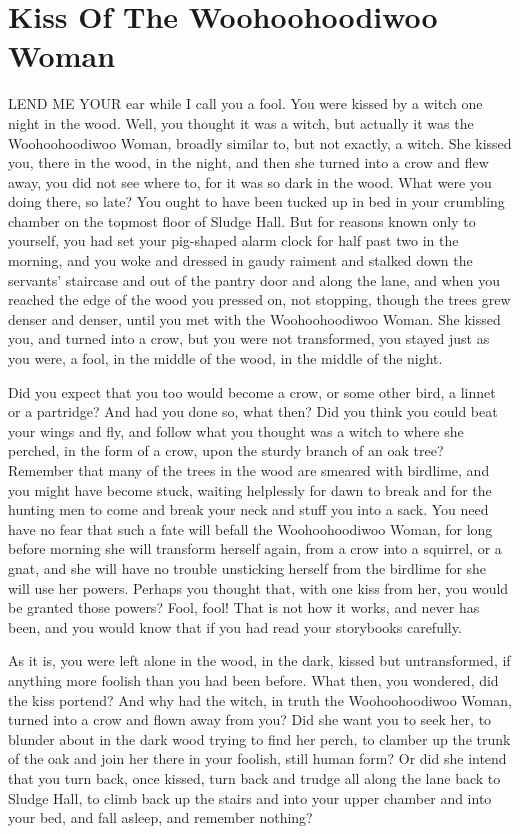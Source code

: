 \chapter{Kiss Of The Woohoohoodiwoo Woman}

LEND ME YOUR ear while I call you a fool. You were kissed by a witch one night in the wood. Well, you thought it was a witch, but actually it was the Woohoohoodiwoo Woman, broadly similar to, but not exactly, a witch. She kissed you, there in the wood, in the night, and then she turned into a crow and flew away, you did not see where to, for it was so dark in the wood. What were you doing there, so late? You ought to have been tucked up in bed in your crumbling chamber on the topmost floor of Sludge Hall. But for reasons known only to yourself, you had set your pig-shaped alarm clock for half past two in the morning, and you woke and dressed in gaudy raiment and stalked down the servants' staircase and out of the pantry door and along the lane, and when you reached the edge of the wood you pressed on, not stopping, though the trees grew denser and denser, until you met with the Woohoohoodiwoo Woman. She kissed you, and turned into a crow, but you were not transformed, you stayed just as you were, a fool, in the middle of the wood, in the middle of the night.

Did you expect that you too would become a crow, or some other bird, a linnet or a partridge? And had you done so, what then? Did you think you could beat your wings and fly, and follow what you thought was a witch to where she perched, in the form of a crow, upon the sturdy branch of an oak tree? Remember that many of the trees in the wood are smeared with birdlime, and you might have become stuck, waiting helplessly for dawn to break and for the hunting men to come and break your neck and stuff you into a sack. You need have no fear that such a fate will befall the Woohoohoodiwoo Woman, for long before morning she will transform herself again, from a crow into a squirrel, or a gnat, and she will have no trouble unsticking herself from the birdlime for she will use her powers. Perhaps you thought that, with one kiss from her, you would be granted those powers? Fool, fool! That is not how it works, and never has been, and you would know that if you had read your storybooks carefully.

As it is, you were left alone in the wood, in the dark, kissed but untransformed, if anything more foolish than you had been before. What then, you wondered, did the kiss portend? And why had the witch, in truth the Woohoohoodiwoo Woman, turned into a crow and flown away from you? Did she want you to seek her, to blunder about in the dark wood trying to find her perch, to clamber up the trunk of the oak and join her there in your foolish, still human form? Or did she intend that you turn back, once kissed, turn back and trudge all along the lane back to Sludge Hall, to climb back up the stairs and into your upper chamber and into your bed, and fall asleep, and remember nothing?

